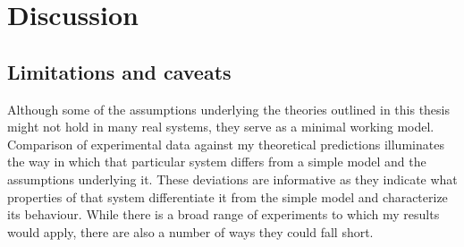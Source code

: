 \chapter{Discussion}



\section{Limitations and caveats}
Although some of the assumptions underlying the theories outlined in this thesis might not hold in many real systems, they serve as a minimal working model. %
Comparison of experimental data against my theoretical predictions illuminates the way in which that particular system differs from a simple model and the assumptions underlying it. 
These deviations are informative as they indicate what properties of that system differentiate it from the simple model and characterize its behaviour. 
While there is a broad range of experiments to which my results would apply, there are also a number of ways they could fall short. %

